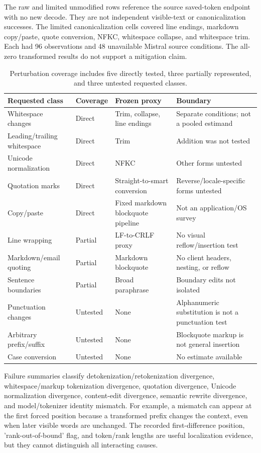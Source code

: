 \documentclass[fleqn,10pt]{wlscirep}
\begin{document}
The raw and limited unmodified rows reference the source saved-token endpoint with no new decode. They are not independent visible-text or canonicalization successes. The limited canonicalization cells covered line endings, markdown copy/paste, quote conversion, NFKC, whitespace collapse, and whitespace trim. Each had 96 observations and 48 unavailable Mistral source conditions. The all-zero transformed results do not support a mitigation claim.

\begin{table}[H]
\centering
\small
\begin{tabularx}{\textwidth}{L{0.21\textwidth}L{0.18\textwidth}Y Y}
\toprule
Requested class & Coverage & Frozen proxy & Boundary \\
\midrule
Whitespace changes & Direct & Trim, collapse, line endings & Separate conditions; not a pooled estimand \\
Leading/trailing whitespace & Direct & Trim & Addition was not tested \\
Unicode normalization & Direct & NFKC & Other forms untested \\
Quotation marks & Direct & Straight-to-smart conversion & Reverse/locale-specific forms untested \\
Copy/paste & Direct & Fixed markdown blockquote pipeline & Not an application/OS survey \\
Line wrapping & Partial & LF-to-CRLF proxy & No visual reflow/insertion test \\
Markdown/email quoting & Partial & Markdown blockquote & No client headers, nesting, or reflow \\
Sentence boundaries & Partial & Broad paraphrase & Boundary edits not isolated \\
Punctuation changes & Untested & None & Alphanumeric substitution is not a punctuation test \\
Arbitrary prefix/suffix & Untested & None & Blockquote markup is not general insertion \\
Case conversion & Untested & None & No estimate available \\
\bottomrule
\end{tabularx}
\caption{\label{tab:coverage}Perturbation coverage includes five directly tested, three partially represented, and three untested requested classes.}
\end{table}

Failure summaries classify detokenization/retokenization divergence, whitespace/markup tokenization divergence, quotation divergence, Unicode normalization divergence, content-edit divergence, semantic rewrite divergence, and model/tokenizer identity mismatch. For example, a mismatch can appear at the first forced position because a transformed prefix changes the context, even when later visible words are unchanged. The recorded first-difference position, 'rank-out-of-bound' flag, and token/rank lengths are useful localization evidence, but they cannot distinguish all interacting causes.
\end{document}
